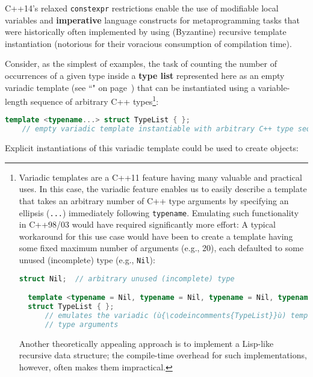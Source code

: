 C++14's relaxed \texttt{constexpr} restrictions enable the use of
modifiable local variables and \textbf{imperative} language constructs
for metaprogramming tasks that were historically often implemented by
using (Byzantine) recursive template instantiation (notorious for their
voracious consumption of compilation time).

Consider, as the simplest of examples, the task of counting the number
of occurrences of a given type inside a \textbf{type list} represented
here as an empty variadic template (see ``" on page~\pageref{variadictemplate}) that can be
instantiated using a variable-length sequence of arbitrary C++ types{\cprotect\footnote{Variadic templates are a C++11
  feature having many valuable and practical uses. In this case, the
  variadic feature enables us to easily describe a template that takes
  an arbitrary number of C++ type arguments by specifying an ellipsis
  (\texttt{...}) immediately following \texttt{typename}. Emulating such
  functionality in C++98/03 would have required significantly more
  effort: A typical workaround for this use case would have been to
  create a template having some fixed maximum number of arguments (e.g.,
  20), each defaulted to some unused (incomplete) type (e.g.,
  \texttt{Nil}):

  \begin{lstlisting}[language=C++, basicstyle={\ttfamily\footnotesize}]
  struct Nil;  // arbitrary unused (incomplete) type

  template <typename = Nil, typename = Nil, typename = Nil, typename = Nil>
  struct TypeList { };
      // emulates the variadic (ù{\codeincomments{TypeList}}ù) template (ù{\codeincomments{struct}}ù) for up to four
      // type arguments
  \end{lstlisting}

\vspace*{-1ex}
\noindent Another theoretically appealing approach is to implement a Lisp-like
  recursive data structure; the compile-time overhead for such
  implementations, however, often makes them impractical.}}:

\begin{lstlisting}[language=C++]
template <typename...> struct TypeList { };
    // empty variadic template instantiable with arbitrary C++ type sequence
\end{lstlisting}

\noindent Explicit instantiations of this variadic template could be used to
create objects:

